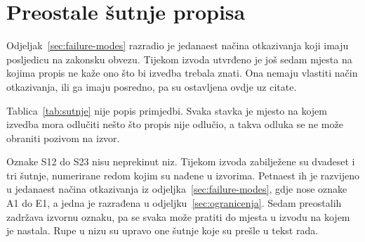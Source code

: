 \chapter{Preostale šutnje propisa}
\label{ch:prilog-sutnje}

Odjeljak~\ref{sec:failure-modes} razradio je jedanaest načina otkazivanja koji
imaju posljedicu na zakonsku obvezu. Tijekom izvoda utvrđeno je još sedam mjesta
na kojima propis ne kaže ono što bi izvedba trebala znati. Ona nemaju vlastiti
način otkazivanja, ili ga imaju posredno, pa su ostavljena ovdje uz citate.

Tablica~\ref{tab:sutnje} nije popis primjedbi. Svaka stavka je mjesto na kojem
izvedba mora odlučiti nešto što propis nije odlučio, a takva odluka se ne može
obraniti pozivom na izvor.

Oznake S12 do S23 nisu neprekinut niz. Tijekom izvoda
zabilježene su dvadeset i tri šutnje, numerirane redom kojim su nađene u
izvorima. Petnaest ih je razvijeno u jedanaest načina otkazivanja iz
odjeljka~\ref{sec:failure-modes}, gdje nose oznake A1 do E1, a jedna je
razrađena u odjeljku~\ref{sec:ogranicenja}. Sedam preostalih zadržava izvornu
oznaku, pa se svaka može pratiti do mjesta u izvodu na kojem je nastala. Rupe u
nizu su upravo one šutnje koje su prešle u tekst rada.

